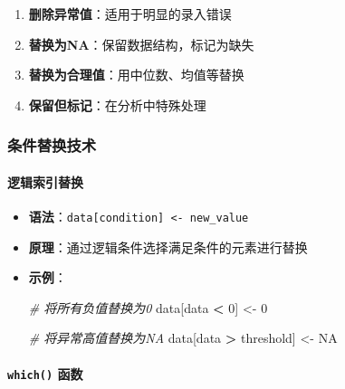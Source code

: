 \documentclass[
]{book}
\newenvironment{Shaded}{\begin{snugshade}}{\end{snugshade}}
\newcommand{\CommentTok}[1]{\textcolor[rgb]{0.56,0.35,0.01}{\textit{#1}}}
\newcommand{\ConstantTok}[1]{\textcolor[rgb]{0.56,0.35,0.01}{#1}}
\newcommand{\DecValTok}[1]{\textcolor[rgb]{0.00,0.00,0.81}{#1}}
\newcommand{\NormalTok}[1]{#1}
\newcommand{\OtherTok}[1]{\textcolor[rgb]{0.56,0.35,0.01}{#1}}
\newcommand{\SpecialCharTok}[1]{\textcolor[rgb]{0.81,0.36,0.00}{\textbf{#1}}}
\begin{document}
\begin{enumerate}
\def\labelenumi{\arabic{enumi}.}
\item
  \textbf{删除异常值}：适用于明显的录入错误
\item
  \textbf{替换为NA}：保留数据结构，标记为缺失
\item
  \textbf{替换为合理值}：用中位数、均值等替换
\item
  \textbf{保留但标记}：在分析中特殊处理
\end{enumerate}

\hypertarget{ux6761ux4ef6ux66ffux6362ux6280ux672f}{%
\subsubsection{条件替换技术}\label{ux6761ux4ef6ux66ffux6362ux6280ux672f}}

\hypertarget{ux903bux8f91ux7d22ux5f15ux66ffux6362}{%
\paragraph{逻辑索引替换}\label{ux903bux8f91ux7d22ux5f15ux66ffux6362}}

\begin{itemize}
\item
  \textbf{语法}：\texttt{data{[}condition{]}\ \textless{}-\ new\_value}
\item
  \textbf{原理}：通过逻辑条件选择满足条件的元素进行替换
\item
  \textbf{示例}：

\begin{Shaded}
\begin{Highlighting}[]
\CommentTok{\# 将所有负值替换为0}
\NormalTok{data[data }\SpecialCharTok{\textless{}} \DecValTok{0}\NormalTok{] }\OtherTok{\textless{}{-}} \DecValTok{0}

\CommentTok{\# 将异常高值替换为NA}
\NormalTok{data[data }\SpecialCharTok{\textgreater{}}\NormalTok{ threshold] }\OtherTok{\textless{}{-}} \ConstantTok{NA}
\end{Highlighting}
\end{Shaded}
\end{itemize}

\hypertarget{which-ux51fdux6570}{%
\paragraph{\texorpdfstring{\texttt{which()} 函数}{which() 函数}}\label{which-ux51fdux6570}}
\end{document}
